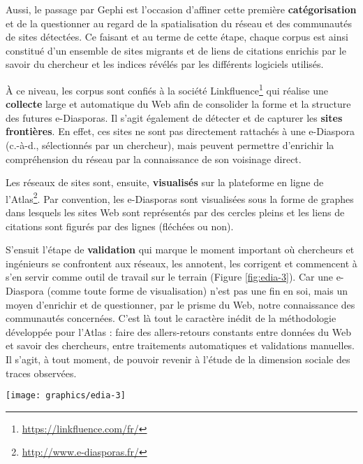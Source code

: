 \documentclass[symmetric,justified,marginals=raggedouter]{tufte-book}
\begin{document}
Aussi, le passage par Gephi est l'occasion d'affiner cette première \textbf{catégorisation} et de la questionner au regard de la spatialisation du réseau et des communautés de sites détectées. Ce faisant et au terme de cette étape, chaque corpus est ainsi constitué d'un ensemble de sites migrants et de liens de citations enrichis par le savoir du chercheur et les indices révélés par les différents logiciels utilisés.   

À ce niveau, les corpus sont confiés à la société Linkfluence\footnote{\RaggedOuter \url{https://linkfluence.com/fr/}} qui réalise une \textbf{collecte} large et automatique du Web afin de consolider la forme et la structure des futures e-Diasporas. Il s'agit également de détecter et de capturer les \textbf{sites frontières}. En effet, ces sites ne sont pas directement rattachés à une e-Diaspora (c.-à-d., sélectionnés par un chercheur), mais peuvent permettre d'enrichir la compréhension du réseau par la connaissance de son voisinage direct. 

Les réseaux de sites sont, ensuite, \textbf{visualisés} sur la plateforme en ligne de l'Atlas\footnote{\RaggedOuter \url{http://www.e-diasporas.fr/}}. Par convention, les e-Diasporas sont visualisées sous la forme de graphes dans lesquels les sites Web sont représentés par des cercles pleins et les liens de citations sont figurés par des lignes (fléchées ou non). 

S'ensuit l'étape de \textbf{validation} qui marque le moment important où cher\-cheurs et ingénieurs se confrontent aux réseaux, les annotent, les corrigent et commencent à s'en servir comme outil de travail sur le terrain (Figure \ref{fig:edia-3}). Car une e-Diaspora (comme toute forme de visualisation) n'est pas une fin en soi, mais un moyen d'enrichir et de questionner, par le prisme du Web, notre connaissance des communautés concernées. C'est là tout le caractère inédit de la méthodologie développée pour l'Atlas : faire des allers-retours constants entre données du Web et savoir des chercheurs, entre traitements automatiques et validations manuelles. Il s'agit, à tout moment, de pouvoir revenir à l'étude de la dimension sociale des traces observées.   

\begin{figure*}
  \texttt{[image: graphics/edia-3]}
  \caption{Annotation de l'e-Diaspora des étudiants Marocains sur Facebook, par S. Marchandise \citep{marchandise_facebook_2014}}
  \label{fig:edia-3}
\end{figure*}  
\end{document}
